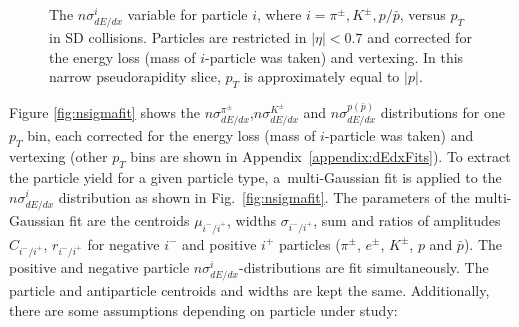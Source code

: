 \begin{figure}[H]
{			\begin{subfigure}[b]{\linewidth}{
					}
			\end{subfigure}
		}
	\caption[The $n\sigma^{i}_{dE/dx}$ variable versus $p_T$ in SD collisions]{The $n\sigma^{i}_{dE/dx}$ variable for particle $i$, where $i=\pi^\pm, K^\pm, p/\bar{p}$, versus $p_T$ in SD collisions. Particles are restricted in $|\eta| < 0.7$
		and corrected for the energy loss (mass of $i$-particle was taken) and vertexing. In
		this narrow pseudorapidity slice, $p_T$ is approximately
		equal to $|p|$.}
	\label{fig:nsigma}
\end{figure}
\noindent Figure \ref{fig:nsigmafit}
shows the $n\sigma^{\pi^\pm}_{dE/dx}$,$n\sigma^{K^\pm}_{dE/dx}$ and $n\sigma^{p(\bar{p})}_{dE/dx}$ distributions for one $p_T$ bin, each corrected for the energy loss\cite{commonnote} (mass of $i$-particle was taken) and vertexing (other $p_T$ bins are shown in Appendix~\ref{appendix:dEdxFits}). To extract the  particle yield for a given particle type,
a~multi-Gaussian fit is applied to the $n\sigma^i_{dE/dx}$ distribution as
shown in Fig.~\ref{fig:nsigmafit}. The parameters of the multi-Gaussian fit are the centroids $\mu_{i^-/i^+}$, widths $\sigma_{i^-/i^+}$, sum  and ratios  of amplitudes $C_{i^-/i^+}$, $r_{i^-/i^+}$ for negative $i^-$ and positive $i^+$ particles ($\pi^\pm$, $e^\pm$, $K^\pm$, $p$ and $\bar{p}$). The positive and negative particle
$n\sigma^{i}_{dE/dx}$-distributions are fit simultaneously. The particle
and antiparticle centroids and widths are kept the same. Additionally, there are some assumptions depending on particle under study:
